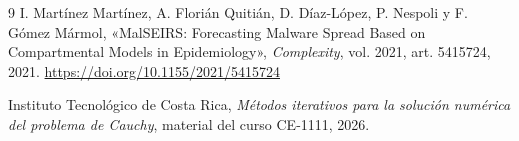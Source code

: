 \documentclass[11pt,a4paper]{article}
\begin{document}
\begin{thebibliography}{9}
I. Martínez Martínez, A. Florián Quitián, D. Díaz-López, P. Nespoli y
F. Gómez Mármol, «MalSEIRS: Forecasting Malware Spread Based on
Compartmental Models in Epidemiology», \textit{Complexity}, vol. 2021,
art. 5415724, 2021. \url{https://doi.org/10.1155/2021/5415724}

Instituto Tecnológico de Costa Rica, \textit{Métodos iterativos para la
solución numérica del problema de Cauchy}, material del curso CE-1111, 2026.
\end{thebibliography}
\end{document}
